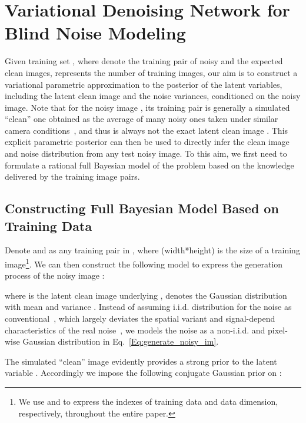 \documentclass{article}
\begin{document}
\vspace{-2mm}\section{Variational Denoising Network for Blind Noise Modeling}\vspace{-2mm}
Given training set , where  denote the  training
pair of noisy and the expected clean images,  represents the number of training images,
 our aim is to construct a variational parametric
approximation to the posterior of the latent variables, including the latent clean image and the noise variances,
conditioned on the noisy image. Note that for the noisy image , its training pair  is
generally a simulated ``clean'' one obtained as the average of many noisy ones taken under similar camera
conditions~\cite{anaya2014renoir,Abdelhamed_2018_CVPR}, and thus is always not the exact latent clean image .
This explicit parametric posterior can then be used to directly infer the clean image and noise
distribution from any test noisy image. To this aim, we first need to formulate a rational full Bayesian
model of the problem based on the knowledge delivered by the training image pairs.

\vspace{-2mm}\subsection{Constructing Full Bayesian Model Based on Training Data}\vspace{-2mm}
Denote  and  as any training pair in ,
where  (width*height) is the size of a training image\footnote{We use  and
 to express the indexes of training data and data dimension, respectively, throughout
the entire paper.}. We can then construct the following model to express the generation process
of the noisy image :

where  is the latent clean image underlying ,  denotes
the Gaussian distribution with mean  and variance .
Instead of assuming i.i.d. distribution for the noise as
conventional~\cite{mairal2008sparse,dong2013nonlocal,gu2014weighted,Xu_2018_ECCV}, which largely deviates the
spatial variant and signal-depend characteristics of the real noise~\cite{zhang2018ffdnet,brooks2018unprocessing},
we models the noise as a non-i.i.d. and pixel-wise Gaussian distribution in Eq.~\eqref{Eq:generate_noisy_im}.

The simulated ``clean'' image  evidently provides a strong prior to the latent variable . Accordingly
we impose the following conjugate Gaussian prior on :
\end{document}
